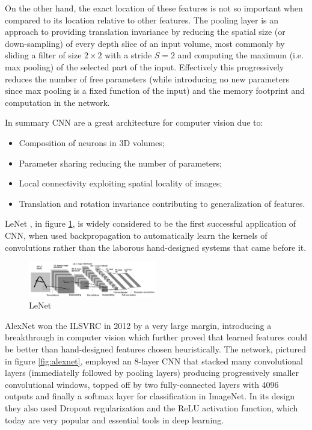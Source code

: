 On the other hand, the exact location of these features is not so important when compared to its location relative to other features. The pooling layer is an approach to providing translation invariance by reducing the spatial size (or down-sampling) of every depth slice of an input volume, most commonly by sliding a filter of size $2 \times 2$ with a stride $S = 2$ and computing the maximum (i.e. max pooling) of the selected part of the input. Effectively this progressively reduces the number of free parameters (while introducing no new parameters since max pooling is a fixed function of the input) and the memory footprint and computation in the network.

In summary \ac{CNN} are a great architecture for computer vision due to:

\begin{itemize}
    \item Composition of neurons in 3D volumes;
    \item Parameter sharing reducing the number of parameters;
    \item Local connectivity exploiting spatial locality of images;
    \item Translation and rotation invariance contributing to generalization of features.
\end{itemize}


LeNet \cite{lenet}, in figure \ref{fig:lenet}, is widely considered to be the first successful application of \ac{CNN}, when \citeauthor{lenet} used backpropagation to automatically learn the kernels of convolutions rather than the laborous hand-designed systems that came before it.

\begin{figure}[ht]
    \centering
    \includegraphics[width=0.5\textwidth]{figs/lenet.png}
    \caption{LeNet}
    \label{fig:lenet}
\end{figure}

AlexNet \cite{alexnet} won the \ac{ILSVRC} \cite{imagenet} in 2012 by a very large margin, introducing a breakthrough in computer vision which further proved that learned features could be better than hand-designed features chosen heuristically. The network, pictured in figure \ref{fig:alexnet}, employed an 8-layer \ac{CNN} that stacked many convolutional layers (immediatelly followed by pooling layers) producing progressively smaller convolutional windows, topped off by two fully-connected layers with 4096 outputs and finally a softmax layer for classification in ImageNet. In its design they also used Dropout regularization and the ReLU activation function, which today are very popular and essential tools in deep learning.

